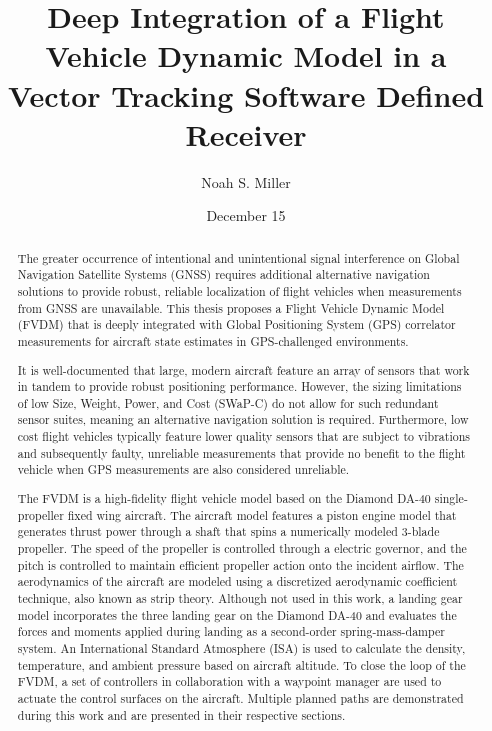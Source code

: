 \documentclass[12pt]{report}
\title{Deep Integration of a Flight Vehicle Dynamic Model in a Vector Tracking Software Defined Receiver}
\author{Noah S. Miller}
\date{December 15}
\begin{document}
\begin{romanpages}      %

  \TitlePage{}
  \begin{abstract}
    The greater occurrence of intentional and unintentional signal interference on Global Navigation Satellite Systems (GNSS) requires additional alternative navigation solutions to provide robust, reliable localization of flight vehicles when measurements from GNSS are unavailable. This thesis proposes a Flight Vehicle Dynamic Model (FVDM) that is deeply integrated with Global Positioning System (GPS) correlator measurements for aircraft state estimates in GPS-challenged environments.

    It is well-documented that large, modern aircraft feature an array of sensors that work in tandem to provide robust positioning performance. However, the sizing limitations of low Size, Weight, Power, and Cost (SWaP-C) do not allow for such redundant sensor suites, meaning an alternative navigation solution is required. Furthermore, low cost flight vehicles typically feature lower quality sensors that are subject to vibrations and subsequently faulty, unreliable measurements that provide no benefit to the flight vehicle when GPS measurements are also considered unreliable.

    The FVDM is a high-fidelity flight vehicle model based on the Diamond DA-40 single-propeller fixed wing aircraft. The aircraft model features a piston engine model that generates thrust power through a shaft that spins a numerically modeled 3-blade propeller. The speed of the propeller is controlled through a electric governor, and the pitch is controlled to maintain efficient propeller action onto the incident airflow. The aerodynamics of the aircraft are modeled using a discretized aerodynamic coefficient technique, also known as strip theory. Although not used in this work, a landing gear model incorporates the three landing gear on the Diamond DA-40 and evaluates the forces and moments applied during landing as a second-order spring-mass-damper system. An International Standard Atmosphere (ISA) is used to calculate the density, temperature, and ambient pressure based on aircraft altitude. To close the loop of the FVDM, a set of controllers in collaboration with a waypoint manager are used to actuate the control surfaces on the aircraft. Multiple planned paths are demonstrated during this work and are presented in their respective sections.


\end{abstract}
\end{romanpages}
\end{document}
